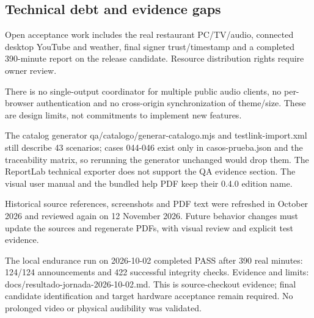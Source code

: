 \subsection{Technical debt and evidence gaps}

Open acceptance work includes the real restaurant PC/TV/audio, connected desktop YouTube and weather, final signer trust/timestamp and a completed 390-minute report on the release candidate. Resource distribution rights require owner review.

There is no single-output coordinator for multiple public audio clients, no per-browser authentication and no cross-origin synchronization of theme/size. These are design limits, not commitments to implement new features.

The catalog generator qa/catalogo/generar-catalogo.mjs and testlink-import.xml still describe 43 scenarios; cases 044-046 exist only in casos-prueba.json and the traceability matrix, so rerunning the generator unchanged would drop them. The ReportLab technical exporter does not support the QA evidence section. The visual user manual and the bundled help PDF keep their 0.4.0 edition name.

Historical source references, screenshots and PDF text were refreshed in October 2026 and reviewed again on 12 November 2026. Future behavior changes must update the sources and regenerate PDFs, with visual review and explicit test evidence.

The local endurance run on 2026-10-02 completed PASS after 390 real minutes: 124/124 announcements and 422 successful integrity checks. Evidence and limits: docs/resultado-jornada-2026-10-02.md. This is source-checkout evidence; final candidate identification and target hardware acceptance remain required. No prolonged video or physical audibility was validated.
